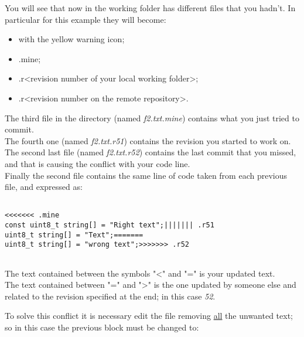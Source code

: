 \newpage


You will see that now in the working folder has different files that you hadn't. In particular for this example they will become:


\begin{itemize}

	\item <file name> with the yellow warning icon;
	
	\item <file name>.mine;
	
	\item <file name>.r<revision number of your local working folder>;
	
	\item <file name>.r<revision number on the remote repository>.

\end{itemize}


The third file in the directory (named \textit{f2.txt.mine}) contains what you just tried to commit.\\


The fourth one (named \textit{f2.txt.r51}) contains the revision you started to work on.\\

The second last file (named \textit{f2.txt.r52}) contains the last commit that you missed, and that is causing the conflict with your code line.\\

Finally the second file contains the same line of code taken from each previous file, and expressed as:

\begin{verbatim}

<<<<<<< .mine
const uint8_t string[] = "Right text";||||||| .r51
uint8_t string[] = "Text";=======
uint8_t string[] = "wrong text";>>>>>>> .r52
    
\end{verbatim}

The text contained between the symbols "<" and "=" is your updated text.\\
The text contained between "=" and ">" is the one updated by someone else and related to the revision specified at the end; in this case \textit{52}.\newline

To solve this conflict it is necessary edit the file removing \underline{all} the unwanted text; so in this case the previous block must be changed to:

